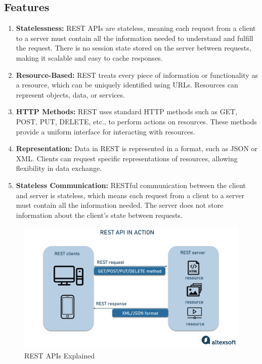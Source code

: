 \documentclass[11pt]{article}
\begin{document}
\subsection{Features}

\begin{enumerate}
    \item \textbf{Statelessness:} REST APIs are stateless, meaning each request from a client to a server must contain all the information needed to understand and fulfill the request. There is no session state stored on the server between requests, making it scalable and easy to cache responses.

    \item \textbf{Resource-Based:} REST treats every piece of information or functionality as a resource, which can be uniquely identified using URLs. Resources can represent objects, data, or services.

    \item \textbf{HTTP Methods:} REST uses standard HTTP methods such as GET, POST, PUT, DELETE, etc., to perform actions on resources. These methods provide a uniform interface for interacting with resources.

    \item \textbf{Representation:} Data in REST is represented in a format, such as JSON or XML. Clients can request specific representations of resources, allowing flexibility in data exchange.

    \item \textbf{Stateless Communication:} RESTful communication between the client and server is stateless, which means each request from a client to a server must contain all the information needed. The server does not store information about the client's state between requests.

\end{enumerate}
\begin{figure}[H]
    \centering
    \includegraphics[width=.95\textwidth]{rest api/rest api_2.jpg}
    \caption{REST APIs Explained}
\end{figure}
\end{document}
